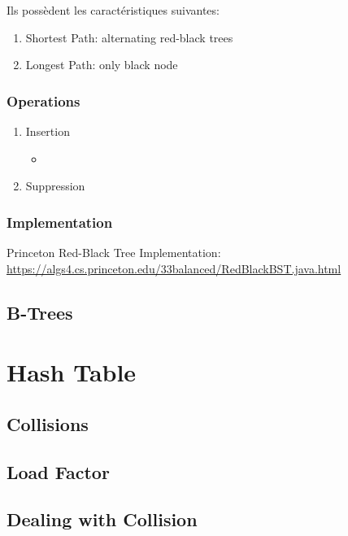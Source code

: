 \documentclass{article}
\begin{document}
Ils possèdent les caractéristiques suivantes:
\begin{enumerate}
    \item Shortest Path: alternating red-black trees
    \item Longest Path: only black node
\end{enumerate}

\subsubsection{Operations}%
\label{ssub:Operations}

\begin{enumerate}
    \item Insertion
	\begin{itemize}
	    \item
	\end{itemize}
    \item Suppression
\end{enumerate}

\subsubsection{Implementation}%
\label{ssub:Implementation}

Princeton Red-Black Tree Implementation:
\url{https://algs4.cs.princeton.edu/33balanced/RedBlackBST.java.html}

\subsection{B-Trees}

\section{Hash Table}

\subsection{Collisions}

\subsection{Load Factor}

\subsection{Dealing with Collision}
\end{document}
